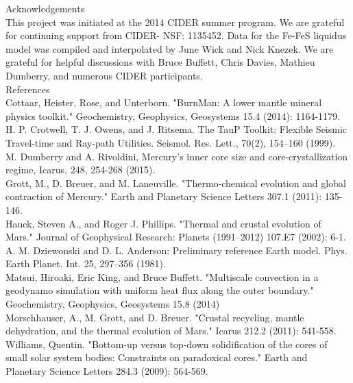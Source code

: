\documentclass[landscape,a0b,final]{a0poster}
\begin{document}
\begin{multicols}{3}
{ \large Acknowledgements \\ \small
This project was initiated at the 2014 CIDER summer program.  We are grateful for continuing support from CIDER- NSF: 1135452.
Data for the Fe-FeS liquidus model was compiled and interpolated by June Wick and Nick Knezek.
We are grateful for helpful discussions with Bruce Buffett, Chris Davies, Mathieu Dumberry, and numerous CIDER participants.
}
\\
{ \large References \\ \tiny
Cottaar, Heister, Rose, and Unterborn. "BurnMan: A lower mantle mineral physics toolkit." Geochemistry, Geophysics, Geosystems 15.4 (2014): 1164-1179. \\
H. P. Crotwell, T. J. Owens, and J. Ritsema. The TauP Toolkit: Flexible Seismic Travel-time and Ray-path Utilities. Seismol. Res. Lett., 70(2), 154–160 (1999). \\
M. Dumberry and A. Rivoldini, Mercury’s inner core size and core-crystallization regime, Icarus, 248, 254-268 (2015). \\
Grott, M., D. Breuer, and M. Laneuville. "Thermo-chemical evolution and global contraction of Mercury." Earth and Planetary Science Letters 307.1 (2011): 135-146. \\
Hauck, Steven A., and Roger J. Phillips. "Thermal and crustal evolution of Mars." Journal of Geophysical Research: Planets (1991–2012) 107.E7 (2002): 6-1. \\
A. M. Dziewonski and D. L. Anderson: Preliminary reference Earth model. Phys. Earth Planet. Int. 25, 297–356 (1981). \\
Matsui, Hiroaki, Eric King, and Bruce Buffett. "Multiscale convection in a geodynamo simulation with uniform heat flux along the outer boundary." Geochemistry, Geophysics, Geosystems 15.8 (2014) \\
Morschhauser, A., M. Grott, and D. Breuer. "Crustal recycling, mantle dehydration, and the thermal evolution of Mars." Icarus 212.2 (2011): 541-558. \\
Williams, Quentin. "Bottom-up versus top-down solidification of the cores of small solar system bodies: Constraints on paradoxical cores." Earth and Planetary Science Letters 284.3 (2009): 564-569.
 }

\end{multicols}
\end{document}

